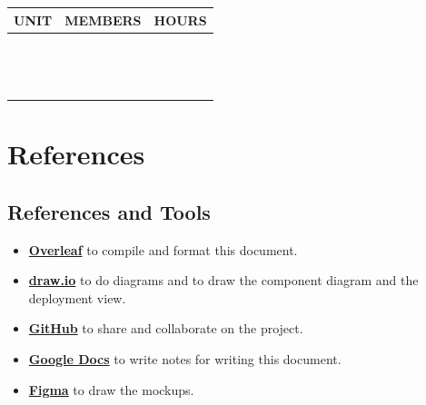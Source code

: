 \documentclass[a4paper,12pt]{article}
\begin{document}
\begin{center}
    \begin{tabular}{|m{5cm}|m{5cm}|m{2cm}|}
        \hline
        \textbf{UNIT} & \textbf{MEMBERS} & \textbf{HOURS} \\ \hline
         & & \\ \hline
         & & \\ \hline
         & & \\ \hline
         & & \\ \hline
         & & \\ \hline
         & & \\ \hline
         & & \\ \hline
         & & \\ \hline
         & & \\ \hline
         & & \\ \hline
         & & \\ \hline
         & & \\ \hline
         & & \\ \hline
         & & \\ \hline
    \end{tabular}
\end{center}
\newpage

\section{References}
\subsection{References and Tools}
\begin{itemize}
    \item \textbf{\href{https://www.overleaf.com/}{Overleaf}} to compile and format this document.
    \item \textbf{\href{https://www.draw.io}{draw.io}} to do diagrams and to draw the component diagram and the deployment view.
    \item \textbf{\href{https://github.com}{GitHub}} to share and collaborate on the project.
    \item \textbf{\href{https://docs.google.com}{Google Docs}} to write notes for writing this document.
    \item \textbf{\href{https://www.figma.com}{Figma}} to draw the mockups.
\end{itemize}
\end{document}
